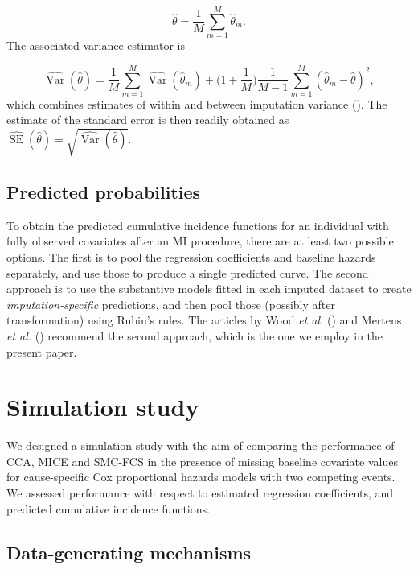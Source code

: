 \documentclass[
  letterpaper,
  DIV=11,
  numbers=noendperiod]{scrreprt}
\DeclareMathOperator{\Var}{Var}
\DeclareMathOperator{\SE}{SE}
\begin{document}
\begin{equation*}
    \hat{\theta} = \frac{1}{M}\sum_{m=1}^{M}\hat{\theta}_m.
\end{equation*} The associated variance estimator is

\begin{equation*}
    \widehat{\Var}(\hat{\theta}) = \frac{1}{M}\sum_{m=1}^{M}\widehat{\Var}(\hat{\theta}_m) + \big(1 + \frac{1}{M}\big)\frac{1}{M-1}\sum_{m=1}^{M}(\hat{\theta}_m - \hat{\theta})^2,
\end{equation*} which combines estimates of within and between
imputation variance (). The
estimate of the standard error is then readily obtained as
\(\widehat{\SE}(\hat{\theta}) = \sqrt{\widehat{\Var}(\hat{\theta})}\).

\subsection{Predicted probabilities}\label{predicted-probabilities}

To obtain the predicted cumulative incidence functions for an individual
with fully observed covariates after an MI procedure, there are at least
two possible options. The first is to pool the regression coefficients
and baseline hazards separately, and use those to produce a single
predicted curve. The second approach is to use the substantive models
fitted in each imputed dataset to create \emph{imputation-specific}
predictions, and then pool those (possibly after transformation) using
Rubin's rules. The articles by Wood \emph{et al.}
() and Mertens
\emph{et al.}
()
recommend the second approach, which is the one we employ in the present
paper.

\section{Simulation study}\label{sec-simstudy}

We designed a simulation study with the aim of comparing the performance
of CCA, MICE and SMC-FCS in the presence of missing baseline covariate
values for cause-specific Cox proportional hazards models with two
competing events. We assessed performance with respect to estimated
regression coefficients, and predicted cumulative incidence functions.

\subsection{Data-generating
mechanisms}\label{data-generating-mechanisms}
\end{document}
